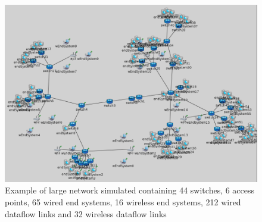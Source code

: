 \documentclass[conference]{IEEEtran}
\begin{document}
\begin{figure}[h]
	\centerline{\includegraphics[keepaspectratio=true, width=16cm] {figures/s1-3}}
	\caption{Example of large network simulated containing 44 switches, 6 access points, 65 wired end systems, 16 wireless end systems, 212 wired dataflow links and 32 wireless dataflow links}
	\label{fig:s1-3}
\end{figure}
\end{document}
